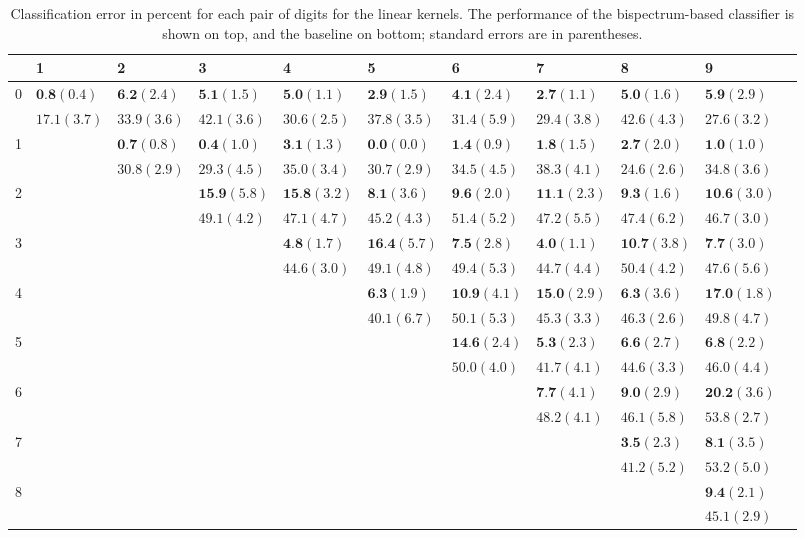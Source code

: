 \documentclass[letterpaper, 10pt]{article}
\theoremstyle{definition}
\begin{document}
\begin{table}[t]
  \tiny
  \centering
  \begin{tabular}{|l|l|l|l|l|l|l|l|l|l|l|}
\hline
&1&2&3&4&5&6&7&8&9\\
\hline
0&${\textbf{0.8}(0.4)}$&${\textbf{6.2}(2.4)}$&${\textbf{5.1}(1.5)}$&${\textbf{5.0}(1.1)}$&${\textbf{2.9}(1.5)}$&${\textbf{4.1}(2.4)}$&${\textbf{2.7}(1.1)}$&${\textbf{5.0}(1.6)}$&${\textbf{5.9}(2.9)}$\\
&${17.1(3.7)}$&${33.9(3.6)}$&${42.1(3.6)}$&${30.6(2.5)}$&${37.8(3.5)}$&${31.4(5.9)}$&${29.4(3.8)}$&${42.6(4.3)}$&${27.6(3.2)}$\\
\hline
1&&${\textbf{0.7}(0.8)}$&${\textbf{0.4}(1.0)}$&${\textbf{3.1}(1.3)}$&${\textbf{0.0}(0.0)}$&${\textbf{1.4}(0.9)}$&${\textbf{1.8}(1.5)}$&${\textbf{2.7}(2.0)}$&${\textbf{1.0}(1.0)}$\\
&&${30.8(2.9)}$&${29.3(4.5)}$&${35.0(3.4)}$&${30.7(2.9)}$&${34.5(4.5)}$&${38.3(4.1)}$&${24.6(2.6)}$&${34.8(3.6)}$\\
\hline
2&&&${\textbf{15.9}(5.8)}$&${\textbf{15.8}(3.2)}$&${\textbf{8.1}(3.6)}$&${\textbf{9.6}(2.0)}$&${\textbf{11.1}(2.3)}$&${\textbf{9.3}(1.6)}$&${\textbf{10.6}(3.0)}$\\
&&&${49.1(4.2)}$&${47.1(4.7)}$&${45.2(4.3)}$&${51.4(5.2)}$&${47.2(5.5)}$&${47.4(6.2)}$&${46.7(3.0)}$\\
\hline
3&&&&${\textbf{4.8}(1.7)}$&${\textbf{16.4}(5.7)}$&${\textbf{7.5}(2.8)}$&${\textbf{4.0}(1.1)}$&${\textbf{10.7}(3.8)}$&${\textbf{7.7}(3.0)}$\\
&&&&${44.6(3.0)}$&${49.1(4.8)}$&${49.4(5.3)}$&${44.7(4.4)}$&${50.4(4.2)}$&${47.6(5.6)}$\\
\hline
4&&&&&${\textbf{6.3}(1.9)}$&${\textbf{10.9}(4.1)}$&${\textbf{15.0}(2.9)}$&${\textbf{6.3}(3.6)}$&${\textbf{17.0}(1.8)}$\\
&&&&&${40.1(6.7)}$&${50.1(5.3)}$&${45.3(3.3)}$&${46.3(2.6)}$&${49.8(4.7)}$\\
\hline
5&&&&&&${\textbf{14.6}(2.4)}$&${\textbf{5.3}(2.3)}$&${\textbf{6.6}(2.7)}$&${\textbf{6.8}(2.2)}$\\
&&&&&&${50.0(4.0)}$&${41.7(4.1)}$&${44.6(3.3)}$&${46.0(4.4)}$\\
\hline
6&&&&&&&${\textbf{7.7}(4.1)}$&${\textbf{9.0}(2.9)}$&${\textbf{20.2}(3.6)}$\\
&&&&&&&${48.2(4.1)}$&${46.1(5.8)}$&${53.8(2.7)}$\\
\hline
7&&&&&&&&${\textbf{3.5}(2.3)}$&${\textbf{8.1}(3.5)}$\\
&&&&&&&&${41.2(5.2)}$&${53.2(5.0)}$\\
\hline
8&&&&&&&&&${\textbf{9.4} (2.1)}$\\
&&&&&&&&&${45.1(2.9)}$\\
\hline
  \end{tabular}
   \caption{Classification error in percent for each pair of digits for the linear kernels. 
  The performance of the bispectrum-based classifier is shown on top, and the baseline on bottom;  
  standard errors are in parentheses.
}
\end{table}\label{tbl:resultslin}
\end{document}
